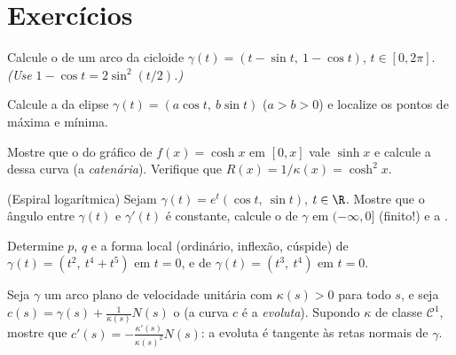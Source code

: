 \section{Exercícios}

\begin{exercise}[$\star$]\label{exo:b2:curves:1}
Calcule o  de um arco da cicloide $\gamma(t) = (t -
\sin t,\ 1 - \cos t)$, $t \in [0, 2\pi]$. \emph{(Use $1 - \cos t =
2\sin^2(t/2)$.)}
\end{exercise}

\begin{exercise}[$\star$]\label{exo:b2:curves:2}
Calcule a  da elipse $\gamma(t) = (a\cos t,\ b\sin
t)$ ($a > b > 0$) e localize os pontos de 
máxima e mínima.
\end{exercise}

\begin{exercise}[$\star$]\label{exo:b2:curves:3}
Mostre que o  do gráfico de $f(x) = \cosh x$ em
$[0, x]$ vale $\sinh x$ e calcule a  dessa
curva (a \emph{catenária}). Verifique que $R(x) = 1/\kappa(x) =
\cosh^2 x$.
\end{exercise}

\begin{exercise}[$\star\star$]\label{exo:b2:curves:4}
(Espiral logarítmica) Sejam $\gamma(t) = e^{t}(\cos t,\ \sin t)$, $t
\in \R$.
Mostre que o ângulo entre $\gamma(t)$ e $\gamma'(t)$ é
constante, calcule o  de $\gamma$ em $(-\infty, 0]$
(finito!) e a .
\end{exercise}

\begin{exercise}[$\star\star$]\label{exo:b2:curves:5}
Determine $p$, $q$ e a forma local (ordinário, inflexão,
cúspide) de $\gamma(t) = (t^2,\ t^4 + t^5)$ em $t = 0$, e de
$\gamma(t) = (t^3,\ t^4)$ em $t = 0$.
\end{exercise}

\begin{exercise}[$\star\star$]\label{exo:b2:curves:6}
Seja $\gamma$ um arco plano de velocidade unitária com $\kappa(s) > 0$ para
todo $s$, e seja $c(s) = \gamma(s) + \frac{1}{\kappa(s)}N(s)$
o  (a curva $c$ é a \emph{evoluta}).
Supondo $\kappa$ de classe $\mathcal{C}^1$, mostre que $c'(s) =
-\frac{\kappa'(s)}{\kappa(s)^2}N(s)$: a evoluta é tangente às
retas normais de $\gamma$.
\end{exercise}

